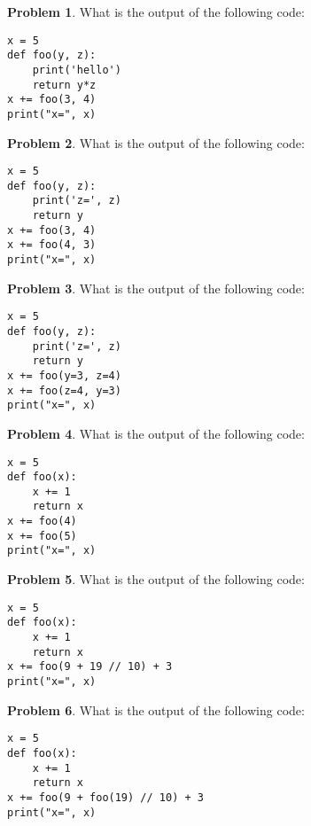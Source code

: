 \documentclass[10pt]{article}
\theoremstyle{definition}
\newtheorem{problem}{Problem}
\begin{document}
\begin{problem}
    What is the output of the following code:
\end{problem}
\begin{lstlisting}
x = 5
def foo(y, z):
    print('hello')
    return y*z
x += foo(3, 4)
print("x=", x)
\end{lstlisting}
\vspace{2in}


\begin{problem}
    What is the output of the following code:
\end{problem}
\begin{lstlisting}
x = 5
def foo(y, z):
    print('z=', z)
    return y
x += foo(3, 4)
x += foo(4, 3)
print("x=", x)
\end{lstlisting}
\vspace{2in}


\begin{problem}
    What is the output of the following code:
\end{problem}
\begin{lstlisting}
x = 5
def foo(y, z):
    print('z=', z)
    return y
x += foo(y=3, z=4)
x += foo(z=4, y=3)
print("x=", x)
\end{lstlisting}
\vspace{2in}


\begin{problem}
    What is the output of the following code:
\end{problem}
\begin{lstlisting}
x = 5
def foo(x):
    x += 1
    return x
x += foo(4)
x += foo(5)
print("x=", x)
\end{lstlisting}
\vspace{2in}


\begin{problem}
    What is the output of the following code:
\end{problem}
\begin{lstlisting}
x = 5
def foo(x):
    x += 1
    return x
x += foo(9 + 19 // 10) + 3
print("x=", x)
\end{lstlisting}
\vspace{2in}


\begin{problem}
    What is the output of the following code:
\end{problem}
\begin{lstlisting}
x = 5
def foo(x):
    x += 1
    return x
x += foo(9 + foo(19) // 10) + 3
print("x=", x)
\end{lstlisting}
\vspace{2in}
\end{document}
